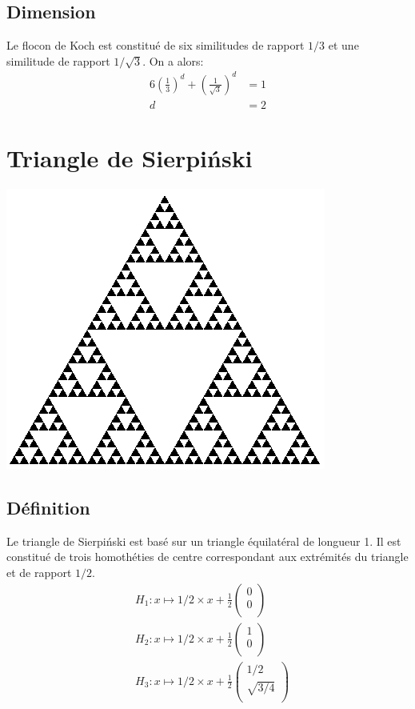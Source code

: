 \documentclass[a4paper, 12pt]{report}
\begin{document}
			\subsection{Dimension}
				Le flocon de Koch est constitué de six similitudes de rapport $1/3$ et une similitude de rapport $1/\sqrt{3}$. On a alors:
				\begin{align*}
					 6\left(\frac{1}{3}\right)^d+\left(\frac{1}{\sqrt{3}}\right)^d	&=1\\
																				d	&=2
				\end{align*}
\newpage
		\section{Triangle de Sierpiński}
			\begin{center}
				\includegraphics[scale=0.7]{Images/triangle}
			\end{center}
			\subsection{Définition}
				Le triangle de Sierpiński est basé sur un triangle équilatéral de longueur 1. Il est constitué de trois homothéties de centre correspondant aux extrémités du triangle et de rapport $1/2$.
				\begin{align*}
					&H_1:x\mapsto 1/2\times x+\frac{1}{2}\left(	\begin{array}{ccc}
															0\\
															0\\
														\end{array}\right)\\
					&H_2:x\mapsto 1/2\times x+\frac{1}{2}\left(	\begin{array}{ccc}
															1\\
															0\\
														\end{array}\right)\\
					&H_3:x\mapsto 1/2\times x+\frac{1}{2}\left(	\begin{array}{ccc}
															1/2\\
															\sqrt{3/4}\\
														\end{array}\right)
				\end{align*}
\end{document}
